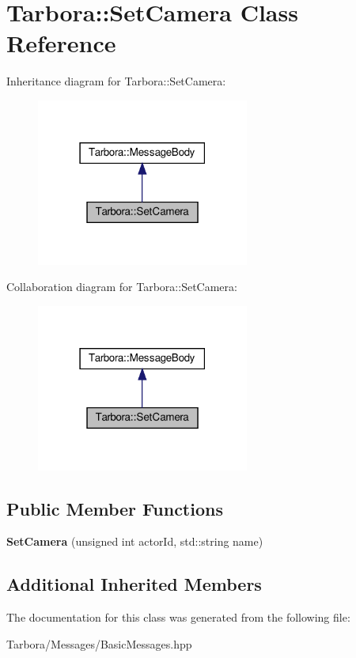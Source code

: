 \hypertarget{classTarbora_1_1SetCamera}{}\section{Tarbora\+:\+:Set\+Camera Class Reference}
\label{classTarbora_1_1SetCamera}


Inheritance diagram for Tarbora\+:\+:Set\+Camera\+:
\nopagebreak
\begin{figure}[H]
\begin{center}
\leavevmode
\includegraphics[width=198pt]{classTarbora_1_1SetCamera__inherit__graph}
\end{center}
\end{figure}


Collaboration diagram for Tarbora\+:\+:Set\+Camera\+:
\nopagebreak
\begin{figure}[H]
\begin{center}
\leavevmode
\includegraphics[width=198pt]{classTarbora_1_1SetCamera__coll__graph}
\end{center}
\end{figure}
\subsection*{Public Member Functions}
\begin{DoxyCompactItemize}
\item 
\mbox{\label{classTarbora_1_1SetCamera_a0bb1288358f98d23f63edb02f165b9ef}} 
{\bfseries Set\+Camera} (unsigned int actor\+Id, std\+::string name)
\end{DoxyCompactItemize}
\subsection*{Additional Inherited Members}


The documentation for this class was generated from the following file\+:\begin{DoxyCompactItemize}
\item 
Tarbora/\+Messages/Basic\+Messages.\+hpp\end{DoxyCompactItemize}
